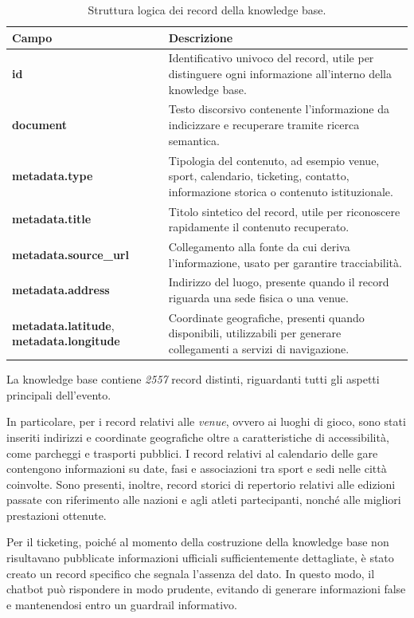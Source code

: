 \begin{table}[H]
\centering
\renewcommand{\arraystretch}{1.25}
\begin{tabular}{p{} p{}}
\toprule
\textbf{Campo} & \textbf{Descrizione} \\
\midrule
\textbf{id}& Identificativo univoco del record, utile per distinguere ogni informazione all’interno della knowledge base. \\
\textbf{document}& Testo discorsivo contenente l’informazione da indicizzare e recuperare tramite ricerca semantica. \\
\textbf{metadata.type}& Tipologia del contenuto, ad esempio venue, sport, calendario, ticketing, contatto, informazione storica o contenuto istituzionale. \\
\textbf{metadata.title}& Titolo sintetico del record, utile per riconoscere rapidamente il contenuto recuperato. \\
\textbf{metadata.source\_url}& Collegamento alla fonte da cui deriva l’informazione, usato per garantire tracciabilità. \\
\textbf{metadata.address}& Indirizzo del luogo, presente quando il record riguarda una sede fisica o una venue. \\
\textbf{metadata.latitude}, \textbf{metadata.longitude}& Coordinate geografiche, presenti quando disponibili, utilizzabili per generare collegamenti a servizi di navigazione. \\
\bottomrule
\end{tabular}
\caption{Struttura logica dei record della knowledge base.}\label{tab:kb-record-structure}
\end{table}

La knowledge base contiene \textit{2557} record distinti, riguardanti tutti gli aspetti principali dell'evento.

In particolare, per i record relativi alle \textit{venue}, ovvero ai luoghi di gioco, sono stati inseriti indirizzi e coordinate geografiche oltre a caratteristiche di accessibilità, come parcheggi e trasporti pubblici. I record relativi al calendario delle gare contengono informazioni su date, fasi e associazioni tra sport e sedi nelle città coinvolte. Sono presenti, inoltre, record storici di repertorio relativi alle edizioni passate con riferimento alle nazioni e agli atleti partecipanti, nonché alle migliori prestazioni ottenute.

Per il ticketing, poiché al momento della costruzione della knowledge base non risultavano pubblicate informazioni ufficiali sufficientemente dettagliate, è stato creato un record specifico che segnala l’assenza del dato. In questo modo, il chatbot può rispondere in modo prudente, evitando di generare informazioni false e mantenendosi entro un guardrail informativo.

